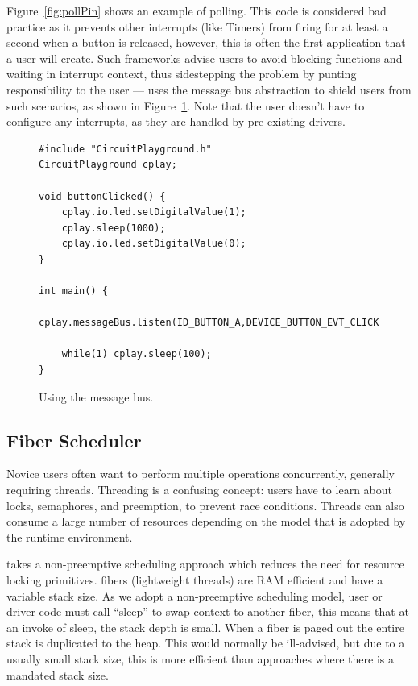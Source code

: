 Figure~\ref{fig:pollPin} shows an example of polling.
  This code is considered bad practice as it prevents other interrupts (like Timers) from firing for at least a second when a button is released, however, this is often the first application that a user will create. Such frameworks advise users to avoid blocking functions and waiting in interrupt context, thus sidestepping the problem by punting responsibility to the user --- \CO uses the message bus abstraction to shield users from such scenarios, as shown in Figure~\ref{fig:messageBus}. Note that the user doesn't have to configure any interrupts, as they are handled by pre-existing drivers.

\begin{figure}
\begin{lstlisting}
#include "CircuitPlayground.h"
CircuitPlayground cplay;

void buttonClicked() {
    cplay.io.led.setDigitalValue(1);
    cplay.sleep(1000);
    cplay.io.led.setDigitalValue(0);
}

int main() {
    cplay.messageBus.listen(ID_BUTTON_A,DEVICE_BUTTON_EVT_CLICK,buttonClicked);

    while(1) cplay.sleep(100);
}
\end{lstlisting}
\caption{\label{fig:messageBus}Using the message bus.}
\end{figure}



\subsection{Fiber Scheduler}

Novice users often want to perform multiple operations concurrently, generally requiring threads. 
Threading is a confusing concept: users have to learn about locks, semaphores, and preemption, to prevent race conditions. Threads can also consume a large number of resources depending on the model that is adopted by the runtime environment.

\CO takes a non-preemptive scheduling approach which reduces the need for resource locking primitives. \CO fibers (lightweight threads) are RAM efficient and have a variable stack size. As we adopt a non-preemptive scheduling model, user or driver code must call ``sleep'' to swap context to another fiber, this means that at an invoke of sleep, the stack depth is small. When a fiber is paged out the entire stack is duplicated to the heap. This would normally be ill-advised, but due to a usually small stack size, this is more efficient than approaches where there is a mandated stack size.

